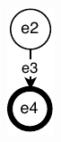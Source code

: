 \documentclass[conference]{IEEEtran}
\begin{document}
\begin{figure}[ht]
    \begin{subfigure}[t]{0.14\linewidth}
        \centering
        \includegraphics[width=\linewidth]{bpmn2_12}

\end{subfigure}
\end{figure}
\end{document}
